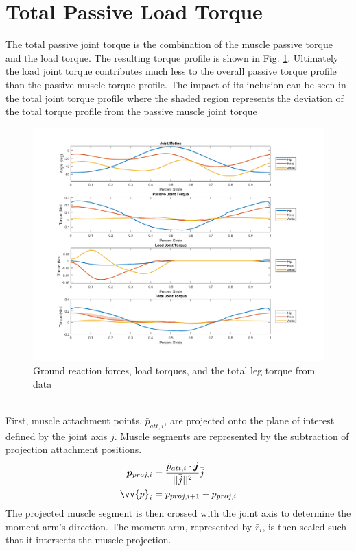\documentclass[runningheads,a4paper]{llncs}
\begin{document}
	\section{Total Passive Load Torque}
		The total passive joint torque is the combination of the muscle passive torque and the load torque. The resulting torque profile is shown in Fig. \ref{fig:loadt2}. Ultimately the load joint torque contributes much less to the overall passive torque profile than the passive muscle torque profile. The impact of its inclusion can be seen in the total joint torque profile where the shaded region represents the deviation of the total torque profile from the passive muscle joint torque
		\begin{figure}
			\centering
			\includegraphics[width=\textwidth]{loadt2.png}
			\caption{Ground reaction forces, load torques, and the total leg torque from data}
			\label{fig:loadt2}
		\end{figure}
		\\
		First, muscle attachment points, $\bar{p}_{att,i}$, are projected onto the plane of interest defined by the joint axis $\bar{j}$. Muscle segments are represented by the subtraction of projection attachment positions.
				\begin{align*}
					\vec{p}_{proj,i} &= \frac{\bar{p}_{att,i} \cdot \vec{j}}{||\bar{j}||^2}\bar{j} \\
					\vv{p}_{i} &= \bar{p}_{proj,i+1}-\bar{p}_{proj,i}
				\end{align*}
		The projected muscle segment is then crossed with the joint axis to determine the moment arm's direction. The moment arm, represented by $\bar{r}_{i}$, is then scaled such that it intersects the muscle projection. 
\end{document}
